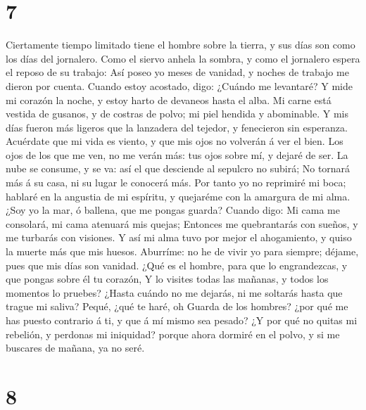 \hypertarget{section-6}{%
\section{7}\label{section-6}}

 Ciertamente tiempo limitado tiene el hombre sobre la
tierra, y sus días son como los días del jornalero.  Como el
siervo anhela la sombra, y como el jornalero espera el reposo de su
trabajo:  Así poseo yo meses de vanidad, y noches de trabajo
me dieron por cuenta.  Cuando estoy acostado, digo: ¿Cuándo
me levantaré? Y mide mi corazón la noche, y estoy harto de devaneos
hasta el alba.  Mi carne está vestida de gusanos, y de
costras de polvo; mi piel hendida y abominable.  Y mis días
fueron más ligeros que la lanzadera del tejedor, y fenecieron sin
esperanza.  Acuérdate que mi vida es viento, y que mis ojos
no volverán á ver el bien.  Los ojos de los que me ven, no
me verán más: tus ojos sobre mí, y dejaré de ser.  La nube
se consume, y se va: así el que desciende al sepulcro no subirá;
 No tornará más á su casa, ni su lugar le conocerá más.
 Por tanto yo no reprimiré mi boca; hablaré en la angustia
de mi espíritu, y quejaréme con la amargura de mi alma. 
¿Soy yo la mar, ó ballena, que me pongas guarda?  Cuando
digo: Mi cama me consolará, mi cama atenuará mis quejas; 
Entonces me quebrantarás con sueños, y me turbarás con visiones.
 Y así mi alma tuvo por mejor el ahogamiento, y quiso la
muerte más que mis huesos.  Aburríme: no he de vivir yo
para siempre; déjame, pues que mis días son vanidad.  ¿Qué
es el hombre, para que lo engrandezcas, y que pongas sobre él tu
corazón,  Y lo visites todas las mañanas, y todos los
momentos lo pruebes?  ¿Hasta cuándo no me dejarás, ni me
soltarás hasta que trague mi saliva?  Pequé, ¿qué te haré,
oh Guarda de los hombres? ¿por qué me has puesto contrario á ti, y que á
mí mismo sea pesado?  ¿Y por qué no quitas mi rebelión, y
perdonas mi iniquidad? porque ahora dormiré en el polvo, y si me
buscares de mañana, ya no seré.

\hypertarget{section-7}{%
\section{8}\label{section-7}}

